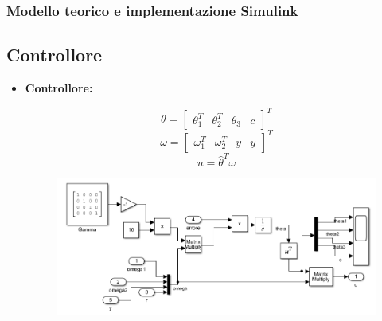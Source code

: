 \documentclass{beamer}
\begin{document}
\begin{frame}
	\frametitle{Modello teorico e implementazione Simulink}
    \subsection{Controllore}
	\begin{itemize}
        \item \textbf{Controllore:}
        \begin{minipage}[t]{0.45\textwidth}
            \begin{equation}
                \theta=\begin{bmatrix}
                    \theta_{1}^{T}&\theta_{2}^{T}&\theta_{3}&c
                \end{bmatrix}^{T}
            \end{equation}
            \begin{equation}
                \omega=\begin{bmatrix}
                    \omega_{1}^{T}&\omega_{2}^T&y&y
                \end{bmatrix}^{T}
            \end{equation}\begin{equation}
                u=\hat{\theta}^T\omega
            \end{equation}
        \end{minipage}
        \begin{minipage}[t]{0.45\textwidth}
            \begin{figure}
                \centering
                \includegraphics[scale=0.4]{2022-05-28-14-51-50.png}%
            \end{figure}
        \end{minipage}
    \end{itemize}
\end{frame}
\end{document}
